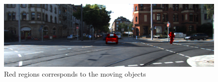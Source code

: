 \begin{figure}
\includegraphics[width=\columnwidth]{./img/ch-laser/mask_0017}
\caption{Red regions corresponds to the moving objects}
\label{fig:mask}
\end{figure}




























